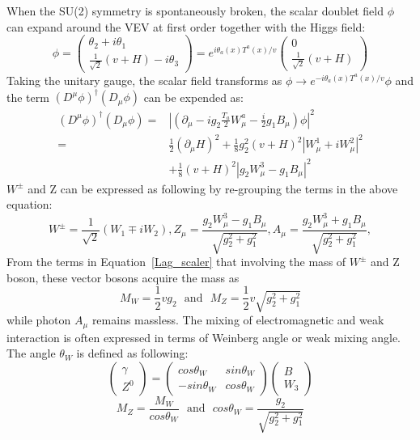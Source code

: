 When the SU(2) symmetry is spontaneously broken, the scalar doublet field $\phi$ can expand around the VEV at first order together with the Higgs field:
\begin{equation}\label{Higgs_vev_expansion}
\phi=
\begin{pmatrix}
\theta_{2}+i\theta_{1} \\
\frac{1}{\sqrt{2}}(v+H)-i\theta_{3}
\end{pmatrix}
=e^{i\theta_{a}(x)T^{a}(x)/v}
\begin{pmatrix}
0\\
\frac{1}{\sqrt{2}}(v+H)
\end{pmatrix}
\end{equation}
Taking the unitary gauge, the scalar field transforms as $\phi \to e^{-i\theta_{a}(x)T^{a}(x)/v}\phi$ and the term $(D^{\mu}\phi)^{\dagger}(D_{\mu}\phi)$ can be expended as:
\begin{equation}\label{Lag_scaler}
\begin{aligned}
(D^{\mu}\phi)^{\dagger}(D_{\mu}\phi)=&|(\partial_{\mu}-ig_{2}\frac{T_{a}}{2}W^{a}_{\mu}-\frac{i}{2}g_{1}B_{\mu})\phi|^{2}\\
                                                          =&\frac{1}{2}(\partial_{\mu}H)^{2}+\frac{1}{8}g^{2}_{2}(v+H)^{2}|W^{1}_{\mu}+iW^{2}_{\mu}|^{2}\\
                                                            &+\frac{1}{8}(v+H)^{2}|g_{2}W^{3}_{\mu}-g_{1}B_{\mu}|^{2}
\end{aligned}
\end{equation}
$W^{\pm}$ and Z can be expressed as following by re-grouping the terms in the above equation: 
\begin{equation}
W^{\pm}=\frac{1}{\sqrt{2}}(W_{1}\mp iW_{2}), Z_{\mu}=\frac{g_{2}W^{3}_{\mu}-g_{1}B_{\mu}}{\sqrt{g_{2}^{2}+g^{2}_{1}}},A_{\mu}=\frac{g_{2}W^{3}_{\mu}+g_{1}B_{\mu}}{\sqrt{g_{2}^{2}+g^{2}_{1}}},
\end{equation}
From the terms in Equation~\ref{Lag_scaler} that involving the mass of $W^{\pm}$ and Z boson, these vector bosons acquire the mass as
\begin{equation}
M_{W}=\frac{1}{2}vg_{2}~~~\textrm{and}~~~M_{Z}=\frac{1}{2}v\sqrt{g^{2}_{2}+g^{2}_{1}}
\end{equation}
while photon $A_{\mu}$ remains massless. The mixing of electromagnetic and weak interaction is often expressed in terms of Weinberg angle or weak mixing angle. The angle $\theta_{W}$ is defined as following:
\[
\begin{pmatrix}
\gamma    \\
Z^{0}
\end{pmatrix}
=
\begin{pmatrix}
cos\theta_{W}  & sin\theta_{W} \\
-sin\theta_{W}  & cos\theta_{W}
\end{pmatrix}
\begin{pmatrix}
B\\
W_{3}
\end{pmatrix}
\]
\begin{equation}
M_{Z}=\frac{M_{W}}{cos\theta_{W}}~~~ \textrm{and}~~~
cos\theta_{W}=\frac{g_{2}}{\sqrt{g_{2}^{2}+g_{1}^{2}}}
\end{equation}

